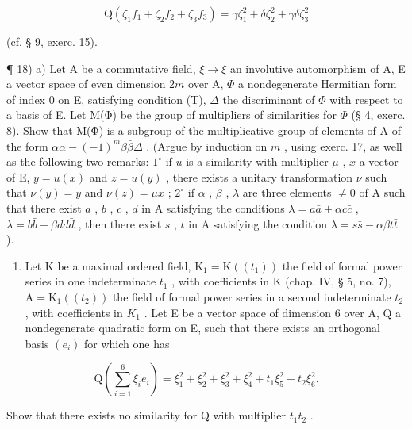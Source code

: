 \[
\mathrm{Q} \left(\zeta_ {1} f _ {1} + \zeta_ {2} f _ {2} + \zeta_ {3} f _ {3}\right) = \gamma \zeta_ {1} ^ {2} + \delta \zeta_ {2} ^ {2} + \gamma \delta \zeta_ {3} ^ {2}
\]

(cf. § 9, exerc. 15).

¶ 18) a) Let A be a commutative field, \(\xi \to \bar{\xi}\) an involutive automorphism of A, E a vector space of even dimension \(2m\) over A, \(\Phi\) a nondegenerate Hermitian form of index 0 on E, satisfying condition (T), \(\Delta\) the discriminant of \(\Phi\) with respect to a basis of E. Let M(Φ) be the group of multipliers of similarities for \(\Phi\) (§ 4, exerc. 8). Show that M(Φ) is a subgroup of the multiplicative group of elements of A of the form \(\alpha\bar{\alpha} - (-1)^{m}\beta\bar{\beta}\Delta\) . (Argue by induction on \(m\) , using exerc. 17, as well as the following two remarks: \(1^{\circ}\) if \(u\) is a similarity with multiplier \(\mu\) , \(x\) a vector of E, \(y = u(x)\) and \(z = u(y)\) , there exists a unitary transformation \(\nu\) such that \(\nu(y) = y\) and \(\nu(z) = \mu x\) ; \(2^{\circ}\) if \(\alpha\) , \(\beta\) , \(\lambda\) are three elements \(\neq 0\) of A such that there exist \(a\) , \(b\) , \(c\) , \(d\) in A satisfying the conditions \(\lambda = a\bar{a} + \alpha c\bar{c}\) , \(\lambda = b\bar{b} + \beta dd\bar{d}\) , then there exist \(s\) , \(t\) in A satisfying the condition \(\lambda = s\bar{s} - \alpha\beta t\bar{t}\) ).

\begin{enumerate}
\def\labelenumi{\alph{enumi})}
\setcounter{enumi}{1}
\tightlist
\item
  Let K be a maximal ordered field, \(\mathrm{K}_{1} = \mathrm{K}((t_{1}))\) the field of formal power series in one indeterminate \(t_{1}\) , with coefficients in K (chap. IV, § 5, no. 7), \(\mathrm{A} = \mathrm{K}_{1}((t_{2}))\) the field of formal power series in a second indeterminate \(t_{2}\) , with coefficients in \(K_{1}\) . Let E be a vector space of dimension 6 over A, Q a nondegenerate quadratic form on E, such that there exists an orthogonal basis \((e_{i})\) for which one has
\end{enumerate}

\[
\mathrm{Q} (\sum_ {i = 1} ^ {6} \xi_ {i} e _ {i}) = \xi_ {1} ^ {2} + \xi_ {2} ^ {2} + \xi_ {3} ^ {2} + \xi_ {4} ^ {2} + t _ {1} \xi_ {5} ^ {2} + t _ {2} \xi_ {6} ^ {2}.
\]

Show that there exists no similarity for Q with multiplier \(t_{1}t_{2}\) .

\backmatter
